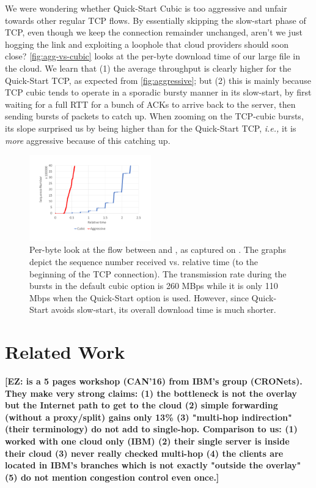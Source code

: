 \documentclass[10pt,sigconf]{acmart}
\newcommand{\mycomm}[3]{{\color{#2} \textbf{[#1: #3]}}}
\newcommand{\mycomm}[3]{}
\newcommand{\EZ}[1]{\mycomm{EZ}{teal}{#1}}
\providecommand{\vs}{vs. }
\providecommand{\ie}{\emph{i.e.,} }
\begin{document}
We were wondering whether Quick-Start Cubic is too aggressive and unfair towards other regular TCP flows. By essentially skipping the slow-start phase of TCP, even though we keep the connection remainder unchanged, aren't we just hogging the link and exploiting a loophole
that cloud providers should soon close?
\autoref{fig:agg-vs-cubic} looks at the per-byte download time of our large file in the cloud. We learn that (1) the average throughput is clearly higher for the Quick-Start TCP, as expected from \autoref{fig:aggressive}; but (2) this is mainly because TCP cubic tends to operate in a sporadic bursty manner in its slow-start, by first waiting for a full RTT for a bunch of ACKs to arrive back to the server, then sending bursts of packets to catch up. When zooming on the TCP-cubic bursts, its slope surprised us by being higher than for the Quick-Start TCP, \ie it is \textit{more} aggressive because of this catching up. 
\begin{figure}[!t]
  \centering
    \includegraphics[width=0.47\textwidth,trim=2mm 2mm 2mm 2mm,clip]{figures/CubicVsAggressive-seq}
    \caption{Per-byte look at the flow between \rs and \rc, as captured on \rc. The graphs depict the sequence number received \vs relative time (to the beginning of the TCP connection). The transmission rate during the bursts in the default cubic option is 260 MBps while it is only 110 Mbps when the Quick-Start option is used. However, since Quick-Start avoids slow-start, its overall download time is much shorter.  
    }
    \label{fig:agg-vs-cubic}
\end{figure}

\section{Related Work}
\EZ{ \cite{le2016understanding} is a 5 pages workshop (CAN'16) from IBM's group (CRONets). They make very strong claims: (1) the bottleneck is not the overlay but the Internet path to get to the cloud (2) simple forwarding (without a proxy/split) gains only 13\% (3) "multi-hop indirection" (their terminology) do not add to single-hop. Comparison to us: (1) worked with one cloud only (IBM) (2) their single server is inside their cloud (3) never really checked multi-hop (4) the clients are located in IBM's branches which is not exactly "outside the overlay" (5) do not mention congestion control even once.}
\end{document}
